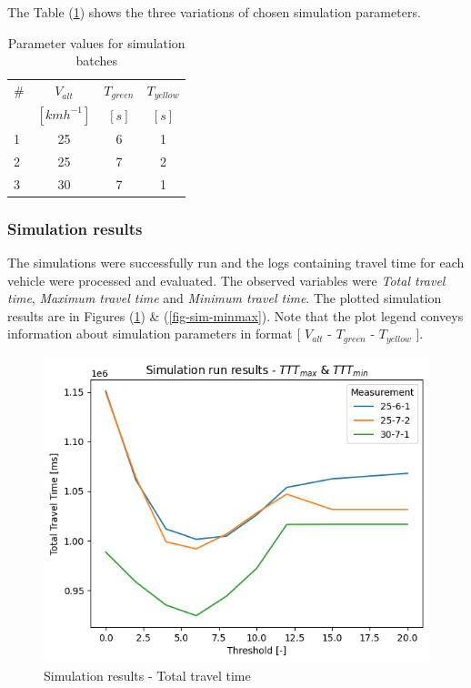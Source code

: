 \documentclass[main.tex]{subfiles}
\begin{document}
The Table (\ref{tab-sims}) shows the three variations of chosen simulation parameters.

\begin{table}[htbp]
    \caption{Parameter values for simulation batches}
    \centering\begin{tabular}{lccc}
        \toprule
        \# & $V_{alt}$ & $T_{green}$ & $T_{yellow}$ \\ 
         & $[kmh^{-1}]$ & $[s]$ & $[s]$ \\ \midrule
        1 & 25  & 6 & 1 \\
        2 & 25  & 7 & 2 \\
        3 & 30  & 7 & 1 \\ \bottomrule
    \end{tabular}
    \label{tab-sims}
\end{table}

\subsubsection{Simulation results}

The simulations were successfully run and the logs containing travel time for each vehicle were processed 
and evaluated. The observed variables were \emph{Total travel time}, \emph{Maximum travel time}
and \emph{Minimum travel time}. The plotted simulation results are in Figures (\ref{fig-sim-ttt}) \& (\ref{fig-sim-minmax}).
Note that the plot legend conveys information about simulation parameters in format [ $V_{alt}$ - $T_{green}$ - $T_{yellow}$ ].

\begin{figure}[htbp]
    \centering
    \includegraphics[width=.8\textwidth]{ttt.png}
    \caption{Simulation results - Total travel time}
    \label{fig-sim-ttt}
\end{figure}
\end{document}
